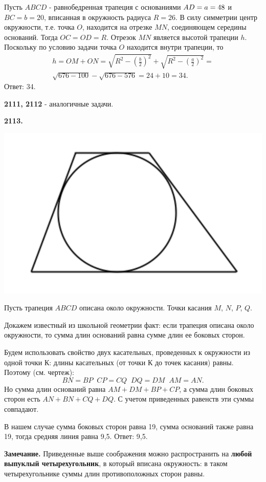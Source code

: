 Пусть $ABCD$ - равнобедренная трапеция с основаниями $\linebreak AD = a =48$ и $BC = b = 20$, вписанная в окружность радиуса $R=26$. В силу симметрии центр окружности, т.е. точка $O$, находится на отрезке $MN$, соединяющем середины оснований. Тогда $OC=OD=R$. Отрезок $MN$ является высотой трапеции $h$. Поскольку по условию задачи точка $O$ находится внутри трапеции, то
\begin{eqnarray*}
h=OM+ON=\sqrt{R^2- \left( \frac{b}{2} \right)^2} +\sqrt{R^2- \left( \frac{a}{2} \right)^2} =\\ \sqrt{676-100} - \sqrt{676-576}=24+10=34.
\end{eqnarray*} \null \hspace*{\fill} Ответ: 34.

\textbf{2111, 2112} - аналогичные задачи.

\textbf{2113.}

{\centering \includegraphics[width=0.4\linewidth]{Geometry/Content/41.png}
	
}

 Пусть трапеция $ABCD$ описана около окружности. Точки касания $M$, $N$, $P$, $Q$. 
  
Докажем известный из школьной геометрии факт: если трапеция описана около окружности, то сумма длин оснований равна сумме длин ее боковых сторон.

Будем использовать свойство двух касательных, проведенных к окружности из одной точки $К$:   длины касательных (от точки $К$ до точек касания) равны. Поэтому (см. чертеж):
\[
BN=BP\;\;CP=CQ\;\;DQ=DM\;\;AM=AN.
\]
Но сумма длин оснований равна $AM+DM+BP+CP$, а сумма длин боковых сторон есть $AN+BN+CQ+DQ$. С учетом приведенных равенств эти суммы совпадают.

В нашем случае  сумма боковых сторон равна 19, сумма оснований также равна 19, тогда средняя линия равна 9,5. \newline \null \hspace*{\fill} Ответ: 9,5.

\textbf{Замечание.} Приведенные выше соображения можно распространить на \textbf{любой выпуклый четырехугольник}, в который вписана окружность: в таком четырехугольнике суммы длин противоположных сторон равны. 

